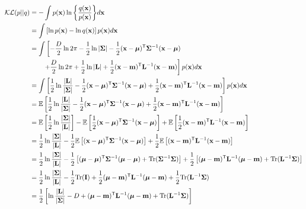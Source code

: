 \documentclass{amsmlaj}
\begin{document}
\begin{problem}
\begin{enumerate}
	\begin{align}
		\mathcal{KL}(p||q)
		&= - \int {p(\bm{\mathbf{x}})\ln \left\{{\frac{{q(\bm{\mathbf{x}})}}{{p(\bm{\mathbf{x}})}}}\right\}} d\bm{\mathbf{x}} \nonumber \\
		&= \int \left[ \ln p(\bm{\mathbf{x}})-\ln q(\bm{\mathbf{x}}) \right] p(\bm{\mathbf{x}})d\bm{\mathbf{x}} \\
		&= \int \left[ -\frac{D}{2}\ln 2\pi
		-\frac{1}{2}\ln|\bm{\mathbf{\Sigma}}|-\frac{1}{2}(\bm{\mathbf{x}}-\bm{\mathbf{\mu}})^{\mathsf{T}}\bm{\mathbf{\Sigma}}^{-1}(\bm{\mathbf{x}}-\bm{\mathbf{\mu}})
			\right. \nonumber \\
			&\qquad \left.+\frac{D}{2}\ln2\pi+\frac{1}{2}\ln|\bm{\mathbf{L}}|
			+\frac{1}{2}(\bm{\mathbf{x}}-\bm{\mathbf{m}})^{\mathsf{T}}\bm{\mathbf{L}}^{-1}(\bm{\mathbf{x}}-\bm{\mathbf{m}})
		\right]p(\bm{\mathbf{x}})d\bm{\mathbf{x}} \\
		&=\int \left[
			\frac{1}{2}\ln\frac{|\bm{\mathbf{L}}|}{|\bm{\mathbf{\Sigma}}|}
			-\frac{1}{2}(\bm{\mathbf{x}}-\bm{\mathbf{\mu}})^{\mathsf{T}}\bm{\mathbf{\Sigma}}^{-1}(\bm{\mathbf{x}}-\bm{\mathbf{\mu}})
			+\frac{1}{2}(\bm{\mathbf{x}}-\bm{\mathbf{m}})^{\mathsf{T}}\bm{\mathbf{L}}^{-1}(\bm{\mathbf{x}}-\bm{\mathbf{m}})
		\right]p(\bm{\mathbf{x}})d\bm{\mathbf{x}} \\
		&=\mathbb{E}\left[
			\frac{1}{2}\ln\frac{|\bm{\mathbf{L}}|}{|\bm{\mathbf{\Sigma}}|}
			-\frac{1}{2}(\bm{\mathbf{x}}-\bm{\mathbf{\mu}})^{\mathsf{T}}\bm{\mathbf{\Sigma}}^{-1}(\bm{\mathbf{x}}-\bm{\mathbf{\mu}})
			+\frac{1}{2}(\bm{\mathbf{x}}-\bm{\mathbf{m}})^{\mathsf{T}}\bm{\mathbf{L}}^{-1}(\bm{\mathbf{x}}-\bm{\mathbf{m}})
		\right] \\
		&=\mathbb{E}\left[ \frac{1}{2}\ln\frac{|\bm{\mathbf{\Sigma}}|}{|\bm{\mathbf{L}}|} \right]
		-\mathbb{E}\left[\frac{1}{2}(\bm{\mathbf{x}}-\bm{\mathbf{\mu}})^{\mathsf{T}}\bm{\mathbf{\Sigma}}^{-1}(\bm{\mathbf{x}}-\bm{\mathbf{\mu}})\right]
		+\mathbb{E}\left[\frac{1}{2}(\bm{\mathbf{x}}-\bm{\mathbf{m}})^{\mathsf{T}}\bm{\mathbf{L}}^{-1}(\bm{\mathbf{x}}-\bm{\mathbf{m}})\right] \\
		&=\frac{1}{2}\ln\frac{|\bm{\mathbf{\Sigma}}|}{|\bm{\mathbf{L}}|}
		-\frac{1}{2}\mathbb{E}\left[
			(\bm{\mathbf{x}}-\bm{\mathbf{\mu}})^{\mathsf{T}}\bm{\mathbf{\Sigma}}^{-1}(\bm{\mathbf{x}}-\bm{\mathbf{\mu}})
		\right]+\frac{1}{2}\mathbb{E}\left[
			(\bm{\mathbf{x}}-\bm{\mathbf{m}})^{\mathsf{T}}\bm{\mathbf{L}}^{-1}(\bm{\mathbf{x}}-\bm{\mathbf{m}})
		\right] \\
		&=\frac{1}{2}\ln\frac{|\bm{\mathbf{\Sigma}}|}{|\bm{\mathbf{L}}|}
		-\frac{1}{2}\left[
			(\bm{\mathbf{\mu}}-\bm{\mathbf{\mu}})^{\mathsf{T}}\bm{\mathbf{\Sigma}}^{-1}(\bm{\mathbf{\mu}}-\bm{\mathbf{\mu}})
			+\text{Tr}(\bm{\mathbf{\Sigma}}^{-1}\bm{\mathbf{\Sigma}})
		\right]+\frac{1}{2}\left[
			(\bm{\mathbf{\mu}}-\bm{\mathbf{m}})^{\mathsf{T}}\bm{\mathbf{L}}^{-1}(\bm{\mathbf{\mu}}-\bm{\mathbf{m}})
			+\text{Tr}(\bm{\mathbf{L}}^{-1}\bm{\mathbf{\Sigma}})
		\right] \\
		&=\frac{1}{2}\ln\frac{|\bm{\mathbf{\Sigma}}|}{|\bm{\mathbf{L}}|}
		-\frac{1}{2}\text{Tr}(\bm{\mathbf{I}})+\frac{1}{2}
		(\bm{\mathbf{\mu}}-\bm{\mathbf{m}})^{\mathsf{T}}\bm{\mathbf{L}}^{-1}(\bm{\mathbf{\mu}}-\bm{\mathbf{m}})
		+\frac{1}{2}\text{Tr}(\bm{\mathbf{L}}^{-1}\bm{\mathbf{\Sigma}}) \\
		&=\frac{1}{2}\left[
			\ln\frac{|\bm{\mathbf{L}}|}{|\bm{\mathbf{\Sigma}}|}-D
			+(\bm{\mathbf{\mu}}-\bm{\mathbf{m}})^{\mathsf{T}}\bm{\mathbf{L}}^{-1}(\bm{\mathbf{\mu}}-\bm{\mathbf{m}})
			+\text{Tr}(\bm{\mathbf{L}}^{-1}\bm{\mathbf{\Sigma}})
		\right]
	\end{align}


\end{enumerate}
\end{problem}
\end{document}

